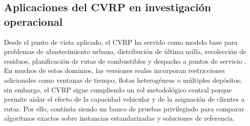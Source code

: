 \subsection{Aplicaciones del CVRP en investigación operacional}

Desde el punto de vista aplicado, el CVRP ha servido como modelo base para problemas de
abastecimiento urbano, distribución de última milla, recolección de residuos,
planificación de rutas de combustibles y despacho a puntos de servicio
\parencite{tan2021vehicle}. En muchos de estos dominios, las versiones reales incorporan
restricciones adicionales como ventanas de tiempo, flotas heterogéneas o múltiples
depósitos; sin embargo, el CVRP sigue cumpliendo un rol metodológico central porque
permite aislar el efecto de la capacidad vehicular y de la asignación de clientes a
rutas. Por ello, continúa siendo un banco de pruebas privilegiado para comparar
algoritmos exactos sobre instancias estandarizadas y soluciones de referencia.